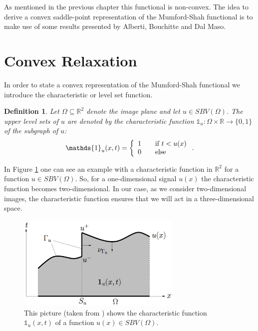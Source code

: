 \documentclass[abstracton]{scrreprt}
\newtheorem{definition}[theorem]{Definition}
\begin{document}
    As mentioned in the previous chapter this functional is non-convex. The idea to derive a convex saddle-point representation of the Mumford-Shah functional is to make use of some results presented by Alberti, Bouchitte and Dal Maso.
    \section{Convex Relaxation} %
    \label{sec:convex_relaxation}
        In order to state a convex representation of the Mumford-Shah functional we introduce the characteristic or level set function.
        \begin{definition}
        \label{def:characteristic_function}
            Let $\Omega \subseteq \mathbb{R}^{2}$ denote the image plane and let $u \in SBV(\Omega)$. The upper level sets of $u$ are denoted by the characteristic function $\mathds{1}_{u}: \Omega \times \mathbb{R} \longrightarrow \{ 0, 1 \}$ of the subgraph of $u$:
                \begin{equation}
                    \mathds{1}_{u}(x, t) =
                        \left\{
                            \begin{array}{l l}
                                1 & \quad \text{if $t < u(x)$} \\
                                0 & \quad \text{else}
                            \end{array}
                        \right. .
                \label{eq:characteristic_function}
                \end{equation}
        \end{definition}
        In Figure \ref{fig:characteristic_function} one can see an example with a characteristic function in $\mathbb{R}^{2}$ for a function $u \in SBV(\Omega)$. So, for a one-dimensional signal $u(x)$ the characteristic function becomes two-dimensional. In our case, as we consider two-dimensional images, the characteristic function ensures that we will act in a three-dimensional space.
        \begin{figure}[!ht]
            \centering
            \includegraphics[width=0.7\textwidth]{img/char_func.png}
            \caption[Characteristic Function of a SBV function.]{This picture (taken from \cite{Pock-et-al-iccv09}) shows the characteristic function $\mathds{1}_{u}(x, t)$ of a function $u(x) \in SBV(\Omega)$.}
            \label{fig:characteristic_function}
        \end{figure}
\end{document}
